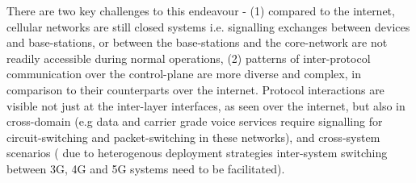 \documentclass[acmsmall,review,authorversion]{acmart}
\begin{document}
{There are two key challenges to this endeavour - (1) compared to the internet, cellular networks are still closed systems i.e. signalling exchanges between devices and base-stations, or between the base-stations and the core-network are not readily accessible during normal operations, (2) patterns of inter-protocol communication over the control-plane are more diverse and complex, in comparison to their counterparts over the internet. Protocol interactions are visible not just at the inter-layer interfaces, as seen over the internet, but also in cross-domain (e.g data and carrier grade voice services require signalling for circuit-switching and packet-switching in these networks), and cross-system scenarios ( due to heterogenous deployment strategies inter-system switching between 3G, 4G and 5G systems need to be facilitated).
\\
}
\end{document}
